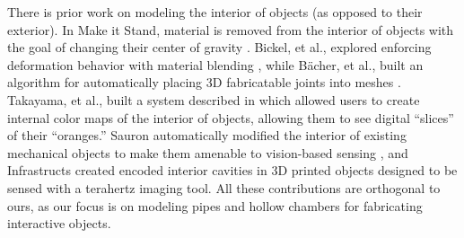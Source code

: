 There is prior work on modeling the interior of objects (as opposed to their exterior).  In Make it Stand, material is removed from the interior of objects with the goal of changing their center of gravity \cite{Prevost-makeitstand}.  Bickel, et al., explored enforcing deformation behavior with material blending \cite{Bickel-deformation}, while B\"{a}cher, et al., built an algorithm for automatically placing 3D fabricatable joints into meshes \cite{Bacher-articulated}.  Takayama, et al., built a system described in \cite{Takayama-fruit} which allowed users to create internal color maps of the interior of objects, allowing them to see digital ``slices'' of their ``oranges.''  Sauron automatically modified the interior of existing mechanical objects to make them amenable to vision-based sensing \cite{Savage-sauron}, and Infrastructs created encoded interior cavities in 3D printed objects designed to be sensed with a terahertz imaging tool.  All these contributions are orthogonal to ours, as our focus is on modeling pipes and hollow chambers for fabricating interactive objects.